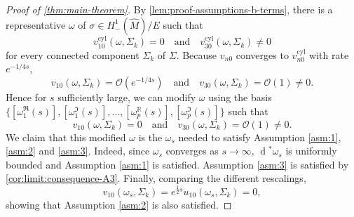 \documentclass[preprint,12pt]{elsarticle}
\numberwithin{table}{section}
\newcommand{\R}{\mathbb{R}}
\renewcommand{\d}{\operatorname{d}\!}
\renewcommand{\O}{\mathcal{O}}
\begin{document}
\begin{proof}[Proof of \cref{thm:main-theorem}]
	By \cref{lem:proof-assumptions-b-terms}, there is a representative $\omega$ of $\sigma \in H^1_-(\hat{M}) /E$ such that 
	$$
	v^{\mathrm{cyl}}_{10}(\omega, \Sigma_k) = 0
	\quad \text{and} \quad
	v^{\mathrm{cyl}}_{30}(\omega, \Sigma_k) \not= 0
	$$
	for every connected component $\Sigma_k$ of $\Sigma$. Because $v_{n0}$ converges to $v^{\mathrm{cyl}}_{n0}$ with rate $e^{-1/4 s}$,
	$$
	v_{10}(\omega, \Sigma_k) = \O(e^{-1/4 s})
	\quad \text{and} \quad
	v_{30}(\omega, \Sigma_k) = \O(1) \not = 0.
	$$
	Hence for $s$ sufficiently large, we can modify $\omega$ using the basis $\{ [\omega_1^\Re(s)],\allowbreak [\omega_1^\Im(s)],\allowbreak\ldots, [\omega_p^\R(s)],\allowbreak [\omega_p^\Im(s)]\}$ 
	such that
	$$
	v_{10}(\omega, \Sigma_k) = 0
	\quad \text{and} \quad
	v_{30}(\omega, \Sigma_k) = \O(1) \not = 0.
	$$
	We claim that this modified $\omega$ is the $\omega_s$ needed to satisfy Assumption \ref{asm:1}, \ref{asm:2} and \ref{asm:3}. Indeed,
	since $\omega_s$ converges as $s \to \infty$, $\d^* \omega_s$ is uniformly bounded and Assumption \ref{asm:1} is satisfied. Assumption \ref{asm:3} is satisfied by \cref{cor:limit:consequence-A3}. Finally, comparing the different rescalings,
	$$
	v_{10}(\omega_s, \Sigma_k) = e^{\frac{1}{2}s} u_{10}(\omega_s, \Sigma_k) = 0,
	$$
	showing that Assumption \ref{asm:2} is also satisfied.
\end{proof}

 

\end{document}
